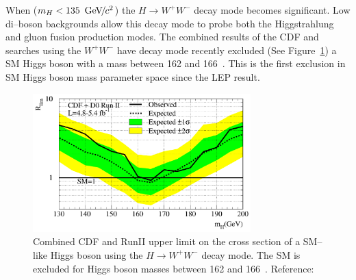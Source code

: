 When \mbox{($m_H < 135~{\,\text{Ge\hspace{-.08em}V\hspace{-0.16em}/\hspace{-0.08em}}c^\text{2}}$)} the $H\to W^{+} W^{-}$ decay mode becomes
significant.  Low di--boson backgrounds allow this decay mode to probe both the
Higgstrahlung and gluon fusion production modes. The combined results of the CDF
and \DZERO searches using the $W^+W^-$ have decay mode recently excluded (See
Figure~\ref{fig:TevatronHighMassHiggsLimit}) a SM Higgs boson with a mass
between 162 and 166~\GeVcc.  This is the first exclusion in SM Higgs boson
mass parameter space since the LEP result.
\begin{figure}
  \centering
  \includegraphics[width=0.75\textwidth]{theory_chapter/figures/tevwwlimits.pdf}
  \caption[Tevatron high mass standard model Higgs boson limit plot]{Combined CDF and
  \DZERO RunII upper limit on the cross section of a SM--like Higgs
  boson using the $H \to W^+W^-$ decay mode.  The SM is excluded for
  Higgs boson masses between 162 and 166~\GeVcc. Reference:~\cite{PDG}}
  \label{fig:TevatronHighMassHiggsLimit}
\end{figure}

